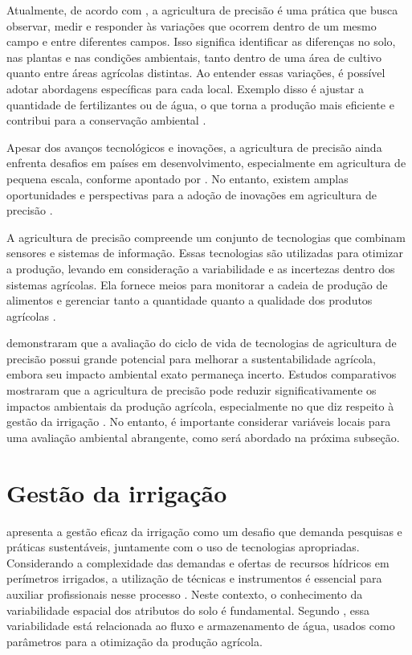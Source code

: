 Atualmente, de acordo com \textcite{Lamine_precision2024}, a agricultura de precisão é uma prática que busca observar, medir e responder às variações que ocorrem dentro de um mesmo campo e entre diferentes campos. Isso significa identificar as diferenças no solo, nas plantas e nas condições ambientais, tanto dentro de uma área de cultivo quanto entre áreas agrícolas distintas. Ao entender essas variações, é possível adotar abordagens específicas para cada local. Exemplo disso é ajustar a quantidade de fertilizantes ou de água, o que torna a produção mais eficiente e contribui para a conservação ambiental \parencite{Lamine_precision2024}.

Apesar dos avanços tecnológicos e inovações, a agricultura de precisão ainda enfrenta desafios em países em desenvolvimento, especialmente em agricultura de pequena escala, conforme apontado por \textcite{Lamine_precision2024}. No entanto, existem amplas oportunidades e perspectivas para a adoção de inovações em agricultura de precisão \parencite{Lamine_precision2024}.

A agricultura de precisão compreende um conjunto de tecnologias que combinam sensores e sistemas de informação. Essas tecnologias são utilizadas para otimizar a produção, levando em consideração a variabilidade e as incertezas dentro dos sistemas agrícolas. Ela fornece meios para monitorar a cadeia de produção de alimentos e gerenciar tanto a quantidade quanto a qualidade dos produtos agrícolas \parencite{Gebbers_precision2010}.

\textcite{Francisco_precision2024} demonstraram que a avaliação do ciclo de vida de tecnologias de agricultura de precisão possui grande potencial para melhorar a sustentabilidade agrícola, embora seu impacto ambiental exato permaneça incerto. Estudos comparativos mostraram que a agricultura de precisão pode reduzir significativamente os impactos ambientais da produção agrícola, especialmente no que diz respeito à gestão da irrigação \parencite{Francisco_precision2024}. No entanto, é importante considerar variáveis locais para uma avaliação ambiental abrangente, como será abordado na próxima subseção.

\section{Gestão da irrigação}

\textcite{Burton_irrigation2010} apresenta a gestão eficaz da irrigação como um desafio que demanda pesquisas e práticas sustentáveis, juntamente com o uso de tecnologias apropriadas. 
Considerando a complexidade das demandas e ofertas de recursos hídricos em perímetros irrigados, a utilização de técnicas e instrumentos é essencial para auxiliar profissionais nesse processo \parencite{Ramos_irrigacao2022}. Neste contexto, o conhecimento da variabilidade espacial dos atributos do solo é fundamental. Segundo \textcite{Ramos_irrigacao2022}, essa variabilidade está relacionada ao fluxo e armazenamento de água, usados como parâmetros para a otimização da produção agrícola.

